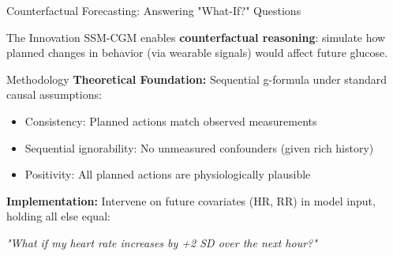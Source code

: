 \documentclass[aspectratio=169,xcolor=dvipsnames]{beamer}
\begin{document}
\begin{frame}{Counterfactual Forecasting: Answering "What-If?" Questions}
    \begin{block}{The Innovation}
        SSM-CGM enables \textbf{counterfactual reasoning}: simulate how planned changes in behavior (via wearable signals) would affect future glucose.
    \end{block}
    
    \begin{block}{Methodology}
        \textbf{Theoretical Foundation:} Sequential g-formula under standard causal assumptions:
        \begin{itemize}
            \item Consistency: Planned actions match observed measurements
            \item Sequential ignorability: No unmeasured confounders (given rich history)
            \item Positivity: All planned actions are physiologically plausible
        \end{itemize}
        
        \vspace{0.5em}
        \textbf{Implementation:} Intervene on future covariates (HR, RR) in model input, holding all else equal:
        \begin{center}
            \textit{"What if my heart rate increases by +2 SD over the next hour?"}
        \end{center}
    \end{block}
\end{frame}  
\end{document}
